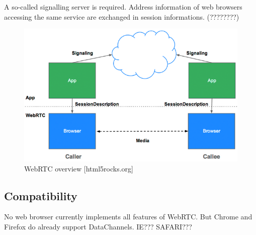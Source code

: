 A so-called signalling server is required. Address information of web browsers accessing the same service are exchanged in session informations. (????????)

\begin{figure}[htp]
  \begin{center}
    \includegraphics[width=0.9\columnwidth]{resources/webrtc.png}
  \end{center}
  \caption{WebRTC overview [html5rocks.org]}
  \label{fig:webrtc}
\end{figure}


\subsection{Compatibility}

No web browser currently implements all features of WebRTC. But Chrome and Firefox do already support DataChannels. IE??? SAFARI??? \cite{webrtc_comp}
